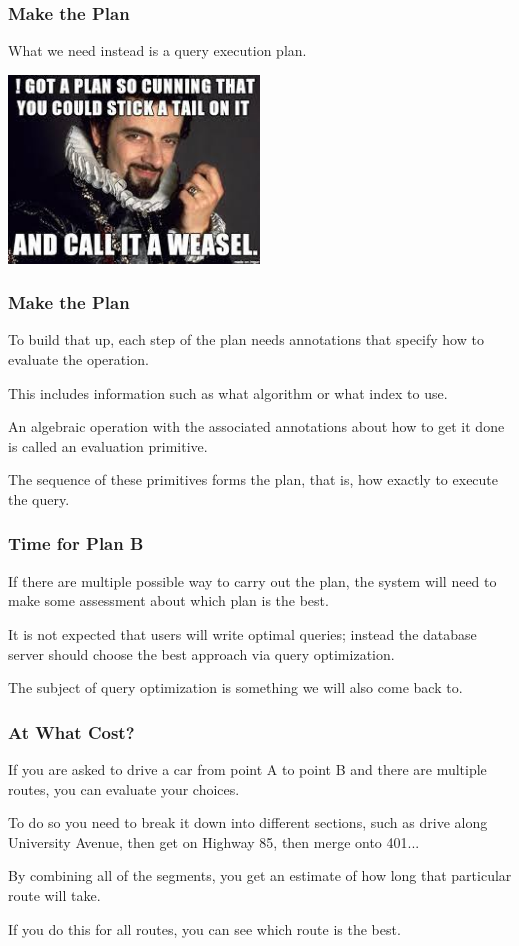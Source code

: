 \begin{frame}
\frametitle{Make the Plan}


What we need instead is a \alert{query execution plan}.

\begin{center}
	\includegraphics[width=0.5\textwidth]{images/blackadder.jpg}
\end{center}

\end{frame}


\begin{frame}
\frametitle{Make the Plan}


To build that up, each step of the plan needs annotations that specify how to evaluate the operation. 

This includes information such as what algorithm or what index to use. 

An algebraic operation with the associated annotations about how to get it done is called an \alert{evaluation primitive}. 

The sequence of these primitives forms the plan, that is, how exactly to execute the query.

\end{frame}

\begin{frame}
\frametitle{Time for Plan B}

If there are multiple possible way to carry out the plan, the system will need to make some assessment about which plan is the best. 

It is not expected that users will write optimal queries; instead the database server should choose the best approach via \alert{query optimization}. 

 The subject of query optimization is something we will also come back to.

\end{frame}

\begin{frame}
\frametitle{At What Cost?}

If you are asked to drive a car from point A to point B and there are multiple routes, you can evaluate your choices. 

To do so you need to break it down into different sections, such as drive along University Avenue, then get on Highway 85, then merge onto 401... 

By combining all of the segments, you get an estimate of how long that particular route will take. 

If you do this for all routes, you can see which route is the best. 

\end{frame}

